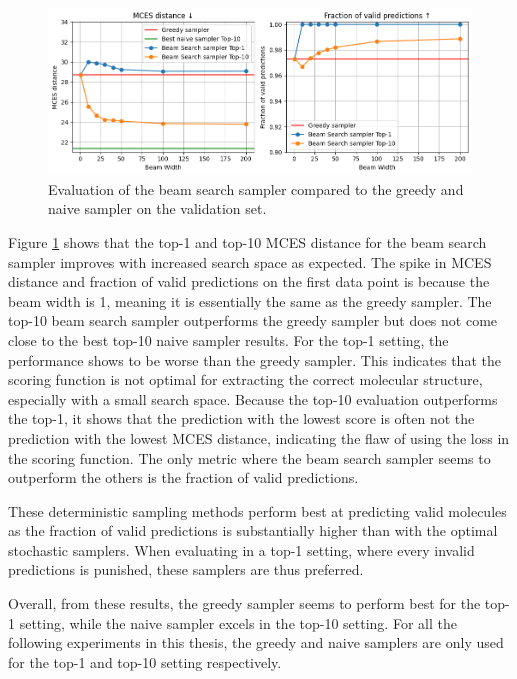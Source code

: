 \begin{figure}[h]
    \centering
    \includegraphics[width=1.0\textwidth]{figures/results/samplers/beam_search.png}
    \caption{Evaluation of the beam search sampler compared to the greedy and naive sampler on the validation set.}
    \label{fig:beam-search}
\end{figure}

Figure \ref{fig:beam-search} shows that the top-1 and top-10 MCES distance for the beam search sampler improves with increased search space as expected.
The spike in MCES distance and fraction of valid predictions on the first data point is because the beam width is 1, meaning it is essentially the same as the greedy sampler.
The top-10 beam search sampler outperforms the greedy sampler but does not come close to the best top-10 naive sampler results. 
For the top-1 setting, the performance shows to be worse than the greedy sampler.
This indicates that the scoring function is not optimal for extracting the correct molecular structure, especially with a small search space.
Because the top-10 evaluation outperforms the top-1, it shows that the prediction with the lowest score is often not the prediction with the lowest MCES distance, indicating the flaw of using the loss in the scoring function.
The only metric where the beam search sampler seems to outperform the others is the fraction of valid predictions.

These deterministic sampling methods perform best at predicting valid molecules as the fraction of valid predictions is substantially higher than with the optimal stochastic samplers.
When evaluating in a top-1 setting, where every invalid predictions is punished, these samplers are thus preferred.

Overall, from these results, the greedy sampler seems to perform best for the top-1 setting, while the naive sampler excels in the top-10 setting.
For all the following experiments in this thesis, the greedy and naive samplers are only used for the top-1 and top-10 setting respectively.


